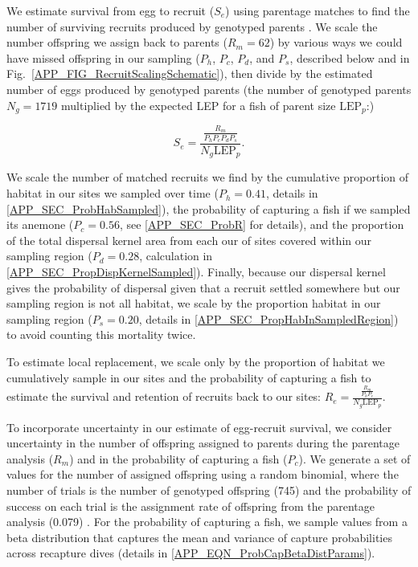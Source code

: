 \documentclass[12pt, oneside]{article}   	%
\begin{document}
We estimate survival from egg to recruit ($S_e$) using parentage matches to find the number of surviving recruits produced by genotyped parents \citep[similar to the method in][]{johnson2018integrating}. We scale the number offspring we assign back to parents ($R_m = 62$) by various ways we could have missed offspring in our sampling ($P_h$, $P_c$, $P_d$, and $P_s$, described below and in Fig.\ \ref{APP_FIG_RecruitScalingSchematic}), then divide by the estimated number of eggs produced by genotyped parents (the number of genotyped parents $N_g = 1719$ multiplied by the expected LEP for a fish of parent size $\text{LEP}_p$:)

\begin{equation}
S_e = \frac{\frac{R_m}{P_h P_c P_d P_s}}{N_g \text{LEP}_p}. \label{EQN_EggRecruitSurv}
\end{equation}

We scale the number of matched recruits we find by the cumulative proportion of habitat in our sites we sampled over time ($P_h = 0.41$, details in \ref{APP_SEC_ProbHabSampled}),
the probability of capturing a fish if we sampled its anemone ($P_c = 0.56$, see \ref{APP_SEC_ProbR} for details), and the proportion of the total dispersal kernel area from each our of sites covered within our sampling region ($P_d =0.28$, calculation in \ref{APP_SEC_PropDispKernelSampled}). Finally, because our dispersal kernel gives the probability of dispersal given that a recruit settled somewhere but our sampling region is not all habitat, we scale by the proportion habitat in our sampling region ($P_s = 0.20$, details in \ref{APP_SEC_PropHabInSampledRegion}) to avoid counting this mortality twice. %

To estimate local replacement, we scale only by the proportion of habitat we cumulatively sample in our sites and the probability of capturing a fish to estimate the survival and retention of recruits back to our sites: $R_e = \frac{\frac{R_m}{P_h P_c}}{N_g \text{LEP}_p}$.

To incorporate uncertainty in our estimate of egg-recruit survival, we consider uncertainty in the number of offspring assigned to parents during the parentage analysis ($R_m$) and in the probability of capturing a fish ($P_c$). We generate a set of values for the number of assigned offspring using a random binomial, where the number of trials is the number of genotyped offspring (745) and the probability of success on each trial is the assignment rate of offspring from the parentage analysis (0.079) \citep{catalanoInPrepconnectivity}. For the probability of capturing a fish, we sample values from a beta distribution that captures the mean and variance of capture probabilities across recapture dives (details in \ref{APP_EQN_ProbCapBetaDistParams}).
\end{document}
